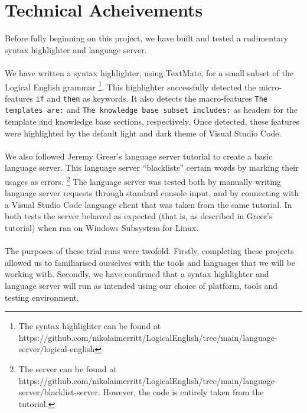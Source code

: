 \documentclass[../main.tex]{subfiles}
\begin{document}
\section*{Technical Acheivements}

Before fully beginning on this project, we have built and tested a rudimentary syntax highlighter and language server. 
\\ \\ 
We have written a syntax highlighter, using TextMate, for a small subset of the Logical English grammar \footnote{The syntax highlighter can be found at https://github.com/nikolaimerritt/LogicalEnglish/tree/main/language-server/logical-english}. This highlighter successfully detected the micro-features \texttt{if} and \texttt{then} as keywords. It also detects the macro-features \texttt{The templates are:} and \texttt{The knowledge base subset includes:} as headers for the template and knowledge base sections, respectively. Once detected, these features were highlighted by the default light and dark theme of Visual Studio Code. 
\\ \\ 
We also followed Jeremy Greer's language server tutorial \cite{blacklist_vscode_tutorial} to create a basic language server. This language server ``blacklists'' certain words by marking their usages as errors. \footnote{The server can be found at https://github.com/nikolaimerritt/LogicalEnglish/tree/main/language-server/blacklist-server. However, the code is entirely taken from the tutorial.} The language server was tested both by manually writing language server requests through standard console input, and by connecting with a Visual Studio Code language client that was taken from the same tutorial. In both tests the server behaved as expected (that is, as described in Greer's tutorial) when ran on Windows Subsystem for Linux. 
\\ \\ 
The purposes of these trial runs were twofold. Firstly, completing these projects allowed us to familiarised ourselves with the tools and languages that we will be working with. Secondly, we have confirmed that a syntax highlighter and language server will run as intended using our choice of platform, tools and testing environment. 
\end{document}
